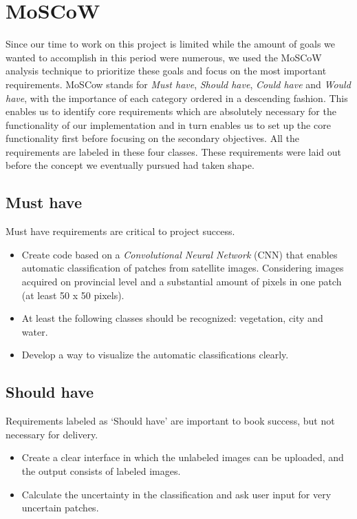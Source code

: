 \documentclass[a4paper,onecolumn]{report}
\begin{document}
\section{MoSCoW}
Since our time to work on this project is limited while the amount of goals we wanted to accomplish in this period were numerous, we used the MoSCoW analysis technique to prioritize these goals and focus on the most important requirements. MoSCow stands for \textit{Must have}, \textit{Should have}, \textit{Could have} and \textit{Would have}, with the importance of each category ordered in a descending fashion. This enables us to identify core requirements which are absolutely necessary for the functionality of our implementation and in turn enables us to set up the core functionality first before focusing on the secondary objectives. All the requirements are labeled in these four classes. These requirements were laid out before the concept we eventually pursued had taken shape.\\

\subsection{Must have}
Must have requirements are critical to project success. 
\begin{itemize}
\item Create code based on a \textit{Convolutional Neural Network} (CNN) that enables automatic classification of patches from satellite images. Considering images acquired on provincial level and a substantial amount of pixels in one patch (at least 50 x 50 pixels). 
\item At least the following classes should be recognized: vegetation, city and water. 
\item Develop a way to visualize the automatic classifications clearly.
\end{itemize}

\subsection{Should have}
Requirements labeled as `Should have' are important to book success, but not necessary for delivery.

\begin{itemize}
\item Create a clear interface in which the unlabeled images can be uploaded, and the output consists of labeled images. 
\item Calculate the uncertainty in the classification and ask user input for very uncertain patches.
\end{itemize}
\end{document}
